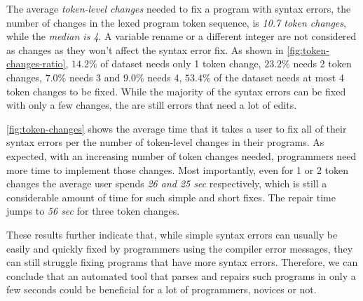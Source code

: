 The average \emph{token-level changes} needed to fix a program with syntax
errors, \ie the number of changes in the lexed program token sequence, is
\emph{10.7 token changes}, while the \emph{median is 4}. A variable rename or a
different integer are not considered as changes as they won't affect the syntax
error fix. As shown in \autoref{fig:token-changes-ratio}, $14.2\%$ of dataset
needs only 1 token change, $23.2\%$ needs 2 token changes, $7.0\%$ needs 3 and
$9.0\%$ needs 4, \ie $53.4\%$ of the dataset needs at most 4 token changes to be
fixed. While the majority of the syntax errors can be fixed with only a few
changes, the are still errors that need a lot of edits.

\autoref{fig:token-changes} shows the average time that it takes a user to fix
all of their syntax errors per the number of token-level changes in their
programs. As expected, with an increasing number of token changes needed,
programmers need more time to implement those changes. Most importantly, even
for 1 or 2 token changes the average user spends \emph{26 and 25 sec}
respectively, which is still a considerable amount of time for such simple and
short fixes. The repair time jumps to \emph{56 sec} for three token changes.

These results further indicate that, while simple syntax errors can usually be
easily and quickly fixed by programmers using the compiler error messages, they
can still struggle fixing programs that have more syntax errors. Therefore, we
can conclude that an automated tool that parses and repairs such programs in
only a few seconds could be beneficial for a lot of programmers, novices or not.
